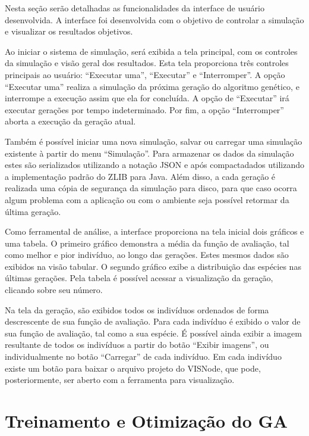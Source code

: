 \documentclass[12pt,oneside,a4paper,english,french,spanish,brazil,]{abntex2}
\begin{document}
Nesta seção serão detalhadas as funcionalidades da interface de usuário desenvolvida. A interface foi desenvolvida com o objetivo de controlar a simulação e visualizar os resultados objetivos. 

Ao iniciar o sistema de simulação, será exibida a tela principal, com os controles da simulação e visão geral dos resultados. Esta tela proporciona três controles principais ao usuário: ``Executar uma'', ``Executar'' e ``Interromper''. A opção ``Executar uma'' realiza a simulação da próxima geração do algoritmo genético, e interrompe a execução assim que ela for concluída. A opção de ``Executar'' irá executar gerações por tempo indeterminado. Por fim, a opção ``Interromper'' aborta a execução da geração atual.

Também é possível iniciar uma nova simulação, salvar ou carregar uma simulação existente à partir do menu ``Simulação''. Para armazenar os dados da simulação estes são serializados utilizando a notação JSON \cite{bray:2017} e após compactadados utilizando a implementação padrão do ZLIB \cite{deutsch:1996} para Java. Além disso, a cada geração é realizada uma cópia de segurança da simulação para disco, para que caso ocorra algum problema com a aplicação ou com o ambiente seja possível retormar da última geração.

Como ferramental de análise, a interface proporciona na tela inicial dois gráficos e uma tabela. O primeiro gráfico demonstra a média da função de avaliação, tal como melhor e pior indivíduo, ao longo das gerações. Estes mesmos dados são exibidos na visão tabular. O segundo gráfico exibe a distribuição das espécies nas últimas gerações. Pela tabela é possível acessar a visualização da geração, clicando sobre seu número.

Na tela da geração, são exibidos todos os indivíduos ordenados de forma descrescente de sua função de avaliação. Para cada indivíduo é exibido o valor de sua função de avaliação, tal como a sua espécie. É possível ainda exibir a imagem resultante de todos os indivíduos a partir do botão ``Exibir imagens'', ou individualmente no botão ``Carregar'' de cada indivíduo. Em cada indivíduo existe um botão para baixar o arquivo projeto do VISNode, que pode, posteriormente, ser aberto com a ferramenta para visualização.

\section{Treinamento e Otimização do GA}
\end{document}
